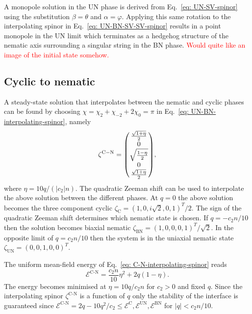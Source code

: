 A monopole solution in the UN phase is derived from Eq.~\eqref{eq: UN-SV-spinor}
using the substitution \(\beta = \theta \) and \(\alpha=\varphi \).
Applying this same rotation to the interpolating spinor in
Eq.~\eqref{eq: UN-BN-SV-SV-spinor} results in a point monopole in the UN limit
which terminates as a hedgehog structure of the nematic axis surrounding a
singular string in the BN phase.
\textcolor{red}{Would quite like an image of the initial state somehow.}

\subsection{Cyclic to nematic}
A steady-state solution that interpolates between the nematic and cyclic phases
can be found by choosing \(\chi = \chi_2 + \chi_{-2} + 2\chi_0 = \pi \) in
Eq.~\eqref{eq: UN-BN-interpolating-spinor}, namely
\begin{equation}\label{eq: C-N-interpolating-spinor}
    \zeta^\mathrm{C-N} = \mqty(
    \frac{\sqrt{1 + \eta}}{2} \\
    0 \\
    \sqrt{\frac{1 - \eta}{2}} \\
    0 \\
    \frac{\sqrt{1 + \eta}}{2}),
\end{equation}
where \(\eta = 10q/(|c_2|n)\).
The quadratic Zeeman shift can be used to interpolate the above solution between
the different phases.
At \(q = 0\) the above solution becomes the three component cyclic
\(\zeta_\mathrm{C} = {(1, 0, i\sqrt{2}, 0, 1)}^T/2\).
The sign of the quadratic Zeeman shift determines which nematic state is chosen.
If \(q = -c_2n/10\) then the solution becomes biaxial nematic
\(\zeta_\mathrm{BN} = {(1, 0, 0, 0, 1)}^T/\sqrt{2}\).
In the opposite limit of \(q = c_2n/10\) then the system is in the uniaxial
nematic state \(\zeta_\mathrm{UN} = {(0, 0, 1, 0, 0)}^T\).

The uniform mean-field energy of Eq.~\eqref{eq: C-N-interpolating-spinor} reads
\begin{equation}
    \mathcal{E}^\text{C-N} = \frac{c_2n}{10}\eta^2 + 2q(1 - \eta).
\end{equation}
The energy becomes minimised at \(\eta = 10q/c_2n\) for \(c_2 > 0\) and fixed
\(q\).
Since the interpolating spinor \(\zeta^\text{C-N}\) is a function of \(q\) only
the stability of the interface is guaranteed since \(\mathcal{E}^\text{C-N} =
2q-10q^2/c_2 \leq \mathcal{E}^\text{C}, \mathcal{E}^\text{UN},
\mathcal{E}^\text{BN}\) for \(|q| < c_2n/10\).

